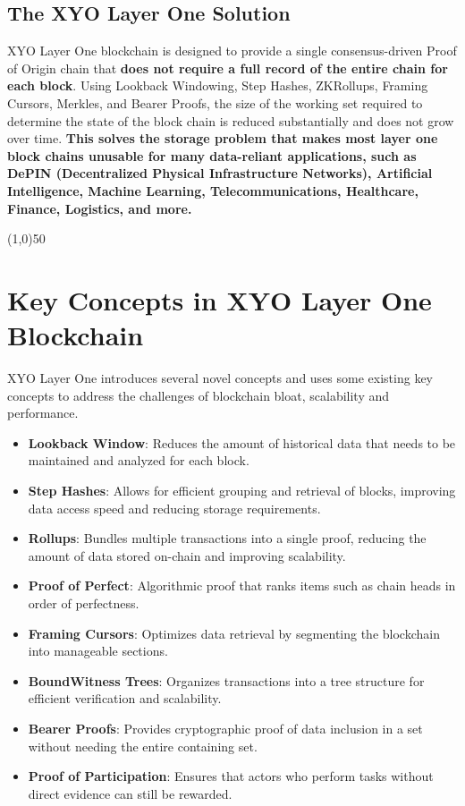 \documentclass{article}
\begin{document}
\subsection{The XYO Layer One Solution}
XYO Layer One blockchain is designed to provide a single consensus-driven Proof
of Origin chain that \textbf{does not require a full record of the entire chain
    for each block}. Using Lookback Windowing, Step Hashes, ZKRollups, Framing
Cursors, Merkles, and Bearer Proofs, the size of the working set required to
determine the state of the block chain is reduced substantially and does not
grow over time. \textbf{This solves the storage problem that makes most layer
    one block chains unusable for many data-reliant applications, such as DePIN
    (Decentralized Physical Infrastructure Networks), Artificial Intelligence,
    Machine Learning, Telecommunications, Healthcare, Finance, Logistics, and
    more.}

\begin{center}
    \line(1,0){50}
\end{center}

\section{Key Concepts in XYO Layer One Blockchain}
XYO Layer One introduces several novel concepts and uses some existing key concepts to
address the challenges of blockchain bloat, scalability and performance.

\begin{itemize}
    \item \textbf{Lookback Window}: Reduces the amount of historical data that needs to be maintained and analyzed for each block.
    \item \textbf{Step Hashes}: Allows for efficient grouping and retrieval of blocks, improving data access speed and reducing storage requirements.
    \item \textbf{Rollups}: Bundles multiple transactions into a single proof, reducing the amount of data stored on-chain and improving scalability.
    \item \textbf{Proof of Perfect}: Algorithmic proof that ranks items such as chain heads in order of perfectness.
    \item \textbf{Framing Cursors}: Optimizes data retrieval by segmenting the blockchain into manageable sections.
    \item \textbf{BoundWitness Trees}: Organizes transactions into a tree structure for efficient verification and scalability.
    \item \textbf{Bearer Proofs}: Provides cryptographic proof of data inclusion in a set without needing the entire containing set.
    \item \textbf{Proof of Participation}: Ensures that actors who perform tasks without direct evidence can still be rewarded.
\end{itemize}
\end{document}
